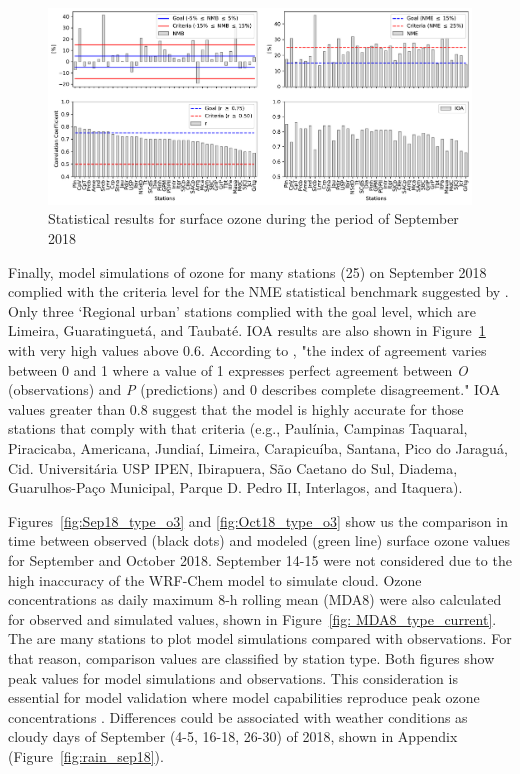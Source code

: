 \begin{figure}[!ht]
\begin{center}
    \includegraphics[width=1\textwidth]{fig/o3_stats.pdf}
\end{center}
  \caption{Statistical results for surface ozone during the period of September 2018}
  \label{fig: o3_stats}
\end{figure}

  Finally, model simulations of ozone for many stations (25) on September 2018 complied with the criteria level for the NME statistical benchmark suggested by \citet{Emery2017}. Only three `Regional urban' stations complied with the goal level, which are Limeira, Guaratinguet\'{a}, and Taubat\'{e}.
  IOA results are also shown in Figure~\ref{fig: o3_stats} with very high values above 0.6.
  According to \citet{Willmott1984}, "the index of agreement varies between 0 and 1 where a value of 1 expresses perfect agreement between \textit{O} (observations) and \textit{P} (predictions) and 0 describes complete disagreement."
  IOA values greater than 0.8 suggest that the model is highly accurate for those stations that comply with that criteria (e.g., Paul\'{i}nia,  Campinas Taquaral, Piracicaba, Americana, Jundia\'{i}, Limeira, Carapicu\'{i}ba, Santana, Pico do Jaragu\'{a}, Cid. Universit\'{a}ria USP IPEN, Ibirapuera, S\~{a}o Caetano do Sul, Diadema, Guarulhos-Pa\c{c}o Municipal, Parque D. Pedro II, Interlagos, and Itaquera).

Figures~\ref{fig:Sep18_type_o3} and \ref{fig:Oct18_type_o3} show us the comparison in time between observed (black dots) and modeled (green line) surface ozone values for September and October 2018.
September 14-15 were not considered due to the high inaccuracy of the WRF-Chem model to simulate cloud.   
Ozone concentrations as daily maximum 8-h rolling mean (MDA8) were also calculated for observed and simulated values, shown in Figure~\ref{fig: MDA8_type_current}.
The are many stations to plot model simulations compared with observations.
For that reason, comparison values are classified by station type.
Both figures show peak values for model simulations and observations.
This consideration is essential for model validation where model capabilities reproduce peak ozone concentrations \citep{Seinfeld2016}.
Differences could be associated with weather conditions as cloudy days of September (4-5, 16-18, 26-30) of 2018, shown in Appendix (Figure~\ref{fig:rain_sep18}).

